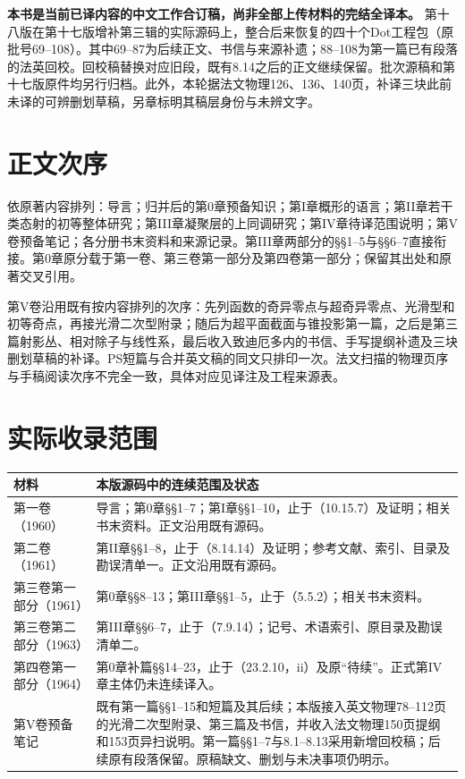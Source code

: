 \maketitle
{}
\noindent\textbf{本书是当前已译内容的中文工作合订稿，尚非全部上传材料的完结全译本。}
第十八版在第十七版增补第三辑的实际源码上，整合后来恢复的四十个Dot工程包（原批号69--108）。其中69--87为后续正文、书信与来源补遗；88--108为第一篇已有段落的法英回校。回校稿替换对应旧段，既有8.14之后的正文继续保留。批次源稿和第十七版原件均另行归档。此外，本轮据法文物理126、136、140页，补译三块此前未译的可辨删划草稿，另章标明其稿层身份与未辨文字。

\section*{正文次序}
依原著内容排列：导言；归并后的第0章预备知识；第I章概形的语言；第II章若干类态射的初等整体研究；第III章凝聚层的上同调研究；第IV章待译范围说明；第V卷预备笔记；各分册书末资料和来源记录。第III章两部分的§§1--5与§§6--7直接衔接。第0章原分载于第一卷、第三卷第一部分及第四卷第一部分；保留其出处和原著交叉引用。

第V卷沿用既有按内容排列的次序：先列函数的奇异零点与超奇异零点、光滑型和初等奇点，再接光滑二次型附录；随后为超平面截面与锥投影第一篇，之后是第三篇射影丛、相对除子与线性系，最后收入致迪厄多内的书信、手写提纲补遗及三块删划草稿的补译。PS短篇与合并英文稿的同文只排印一次。法文扫描的物理页序与手稿阅读次序不完全一致，具体对应见译注及工程来源表。

\clearpage
\section*{实际收录范围}
\begin{longtable}{@{}p{.25\linewidth}p{.67\linewidth}@{}}
\toprule 材料&本版源码中的连续范围及状态\\\midrule\endhead
第一卷（1960）&导言；第0章§§1--7；第I章§§1--10，止于（10.15.7）及证明；相关书末资料。正文沿用既有源码。\\
第二卷（1961）&第II章§§1--8，止于（8.14.14）及证明；参考文献、索引、目录及勘误清单一。正文沿用既有源码。\\
第三卷第一部分（1961）&第0章§§8--13；第III章§§1--5，止于（5.5.2）；相关书末资料。\\
第三卷第二部分（1963）&第III章§§6--7，止于（7.9.14）；记号、术语索引、原目录及勘误清单二。\\
第四卷第一部分（1964）&第0章补篇§§14--23，止于（23.2.10，ii）及原“待续”。正式第IV章主体仍未连续译入。\\
第V卷预备笔记&既有第一篇§§1--15和短篇及其后续；本版接入英文物理78--112页的光滑二次型附录、第三篇及书信，并收入法文物理150页提纲和153页异扫说明。第一篇§§1--7与8.1--8.13采用新增回校稿；后续原有段落保留。原稿缺文、删划与未决事项仍明示。\\
\bottomrule
\end{longtable}

